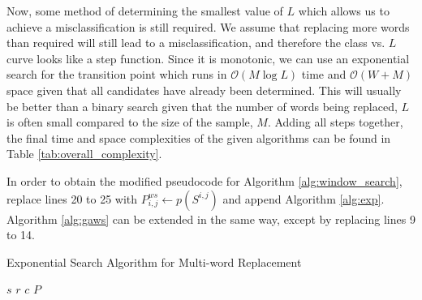 Now, some method of determining the smallest value of $L$ which allows us to achieve a misclassification is still required.  We assume that replacing more words than required will still lead to a misclassification, and therefore the class vs. $L$ curve looks like a step function.  Since it is monotonic, we can use an exponential search for the transition point which runs in $\mathcal{O}(M\log L)$ time and $\mathcal{O}(W+M)$ space given that all candidates have already been determined.  This will usually be better than a binary search given that the number of words being replaced, $L$ is often small compared to the size of the sample, $M$.  Adding all steps together, the final time and space complexities of the given algorithms can be found in Table \ref{tab:overall_complexity}.

In order to obtain the modified pseudocode for Algorithm \ref{alg:window_search}, replace lines 20 to 25 with $P^{ws}_{i,j} \gets p(S^{i,j})$ and append Algorithm \ref{alg:exp}.  Algorithm \ref{alg:gaws} can be extended in the same way, except by replacing lines 9 to 14. 

\begin{algorithm}
\begin{algorithmic}[1]
\begin{spacing}{1.0}
    \caption{Exponential Search Algorithm for Multi-word Replacement}
    \Require $s$ 
    \Require $r$ 
    \Require $c$ 
    \Require $P$ 
        \EndIf
    \EndFor\\
        \EndIf
        \EndIf
             
        \EndFor
            \EndIf
        \EndIf
    \EndWhile\\
\EndIf\\
\label{alg:exp}
\end{spacing}
\end{algorithmic}
\end{algorithm}

